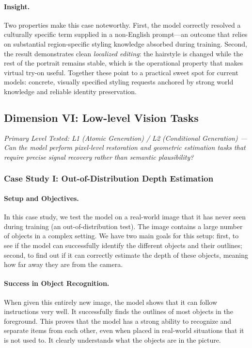 \paragraph{Insight.}
Two properties make this case noteworthy. First, the model correctly resolved a culturally specific term supplied in a non-English prompt---an outcome that relies on substantial region-specific styling knowledge absorbed during training. Second, the result demonstrates clean \emph{localized editing}: the hairstyle is changed while the rest of the portrait remains stable, which is the operational property that makes virtual try-on useful. Together these point to a practical sweet spot for current models: concrete, visually specified styling requests anchored by strong world knowledge and reliable identity preservation.

\subsection{Dimension VI: Low-level Vision Tasks}

\noindent\textit{Primary Level Tested: L1 (Atomic Generation) / L2 (Conditional Generation) --- Can the model perform pixel-level restoration and geometric estimation tasks that require precise signal recovery rather than semantic plausibility?}
\subsubsection{Case Study I: Out-of-Distribution Depth Estimation}
\paragraph{Setup and Objectives.} 
In this case study, we test the model on a real-world image that it has never seen during training (an out-of-distribution test). The image contains a large number of objects in a complex setting. We have two main goals for this setup: first, to see if the model can successfully identify the different objects and their outlines; second, to find out if it can correctly estimate the depth of these objects, meaning how far away they are from the camera.

\paragraph{Success in Object Recognition.} 
When given this entirely new image, the model shows that it can follow instructions very well. It successfully finds the outlines of most objects in the foreground. This proves that the model has a strong ability to recognize and separate items from each other, even when placed in real-world situations that it is not used to. It clearly understands what the objects are in the picture.

